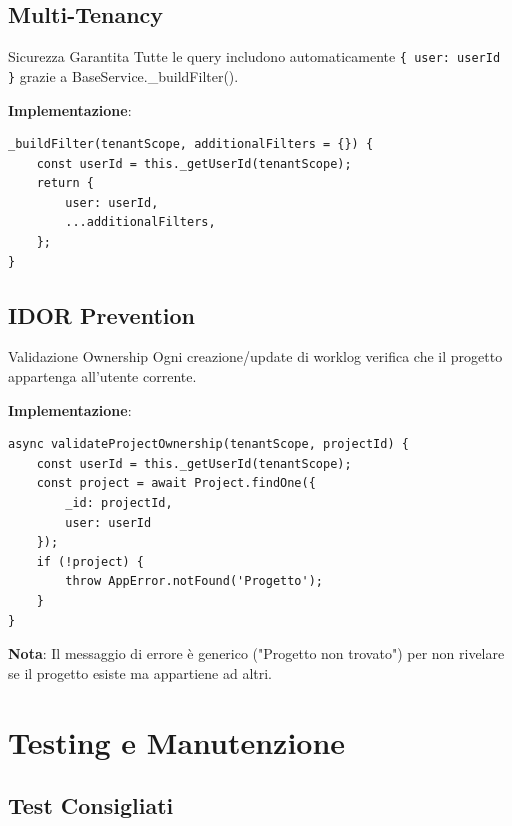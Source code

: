 \documentclass[11pt,a4paper]{article}
\begin{document}
\subsection{Multi-Tenancy}

\begin{successbox}{Sicurezza Garantita}
Tutte le query includono automaticamente \texttt{\{ user: userId \}} grazie a BaseService.\_buildFilter().
\end{successbox}

\textbf{Implementazione}:
\begin{lstlisting}
_buildFilter(tenantScope, additionalFilters = {}) {
    const userId = this._getUserId(tenantScope);
    return {
        user: userId,
        ...additionalFilters,
    };
}
\end{lstlisting}

\subsection{IDOR Prevention}

\begin{successbox}{Validazione Ownership}
Ogni creazione/update di worklog verifica che il progetto appartenga all'utente corrente.
\end{successbox}

\textbf{Implementazione}:
\begin{lstlisting}
async validateProjectOwnership(tenantScope, projectId) {
    const userId = this._getUserId(tenantScope);
    const project = await Project.findOne({ 
        _id: projectId, 
        user: userId 
    });
    if (!project) {
        throw AppError.notFound('Progetto');
    }
}
\end{lstlisting}

\textbf{Nota}: Il messaggio di errore è generico ("Progetto non trovato") per non rivelare se il progetto esiste ma appartiene ad altri.

\section{Testing e Manutenzione}

\subsection{Test Consigliati}
\end{document}
